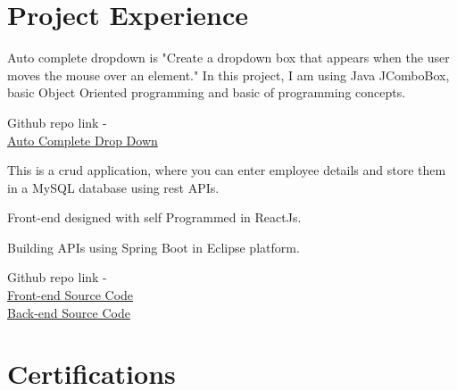 \documentclass[letterpaper]{deedy-resume}
\begin{document}
\begin{minipage}[t]{0.66\textwidth}

\section{Project Experience}


\begin{tightitemize}
    \item Auto complete dropdown is "Create a dropdown box that appears when the user moves the mouse over an element." In this project, I am using Java JComboBox, basic Object Oriented programming and basic of programming concepts.
    \item Github repo link - \\
    \href{https://github.com/mr-rakesh-ranjan/Auto-Complete-Drop-Down}{Auto Complete Drop Down}
\end{tightitemize}
\sectionspace 

\begin{tightitemize}
\item This is a crud application, where you can enter employee details and store them in a MySQL database using rest APIs.
\item Front-end designed with self Programmed in ReactJs.
\item Building APIs using Spring Boot in Eclipse platform.
\item Github repo link - \\ \href{https://github.com/mr-rakesh-ranjan/employee-ui}{Front-end Source Code} \\
\href{https://github.com/mr-rakesh-ranjan/employee-api}{Back-end Source Code}
\end{tightitemize} 

\sectionspace 




\section{Certifications}


\end{minipage}
\end{document}
